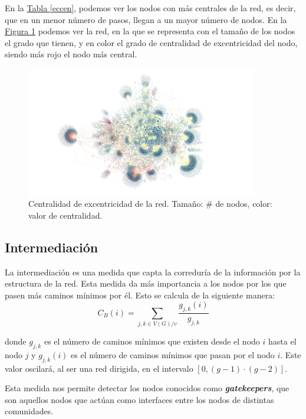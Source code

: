 \documentclass[paper=a4, fontsize=11pt]{article} %
\numberwithin{equation}{section} %
\numberwithin{figure}{section} %
\numberwithin{table}{section} %
\begin{document}
En la \hyperref[eccen]{Tabla \ref*{eccen}}, podemos ver los nodos con más centrales de la red, es decir, que en un menor número de pasos, llegan a un mayor número de nodos. En la \hyperref[im4]{Figura \ref*{im8}} podemos ver la red, en la que se representa con el tamaño de los nodos el grado que tienen, y en color el grado de centralidad de excentricidad del nodo, siendo más rojo el nodo más central.

\begin{figure}[H]
  \centering
  \includegraphics[width=0.9\textwidth]{img/eccen}
  \caption{Centralidad de excentricidad de la red. Tamaño: \# de nodos, color: valor de centralidad.}
  \label{im8}
\end{figure}

\subsection{Intermediación}

La intermediación es una medida que capta la correduría de la información por la estructura de la red. Esta medida da más importancia a los nodos por los que pasen más caminos mínimos por él. Esto se calcula de la siguiente manera:
\begin{displaymath}
  C_B(i) = \sum_{j, k \in V(G)/v}\frac{g_{j,k}(i)}{g_{j,k}}
\end{displaymath}

donde $g_{j,k}$ es el número de caminos mínimos que existen desde el nodo $i$ hasta el nodo $j$ y $g_{j,k}(i)$ es el número de caminos mínimos que pasan por el nodo $i$. Este valor oscilará, al ser una red dirigida, en el intervalo $[0, (g-1)\cdot(g-2)]$.

Esta medida nos permite detectar los nodos conocidos como \textit{\textbf{gatekeepers}}, que son aquellos nodos que actúan como interfaces entre los nodos de distintas comunidades.
\end{document}
